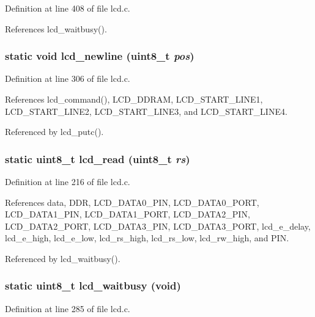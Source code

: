 Definition at line 408 of file lcd.c.

References lcd\_\-waitbusy().
\subsubsection{\setlength{\rightskip}{0pt plus 5cm}static void lcd\_\-newline (uint8\_\-t {\em pos})\hspace{0.3cm}{\tt  [inline, static]}}\label{lcd_8c_a905930e4947d59421e0a8033d971676}




Definition at line 306 of file lcd.c.

References lcd\_\-command(), LCD\_\-DDRAM, LCD\_\-START\_\-LINE1, LCD\_\-START\_\-LINE2, LCD\_\-START\_\-LINE3, and LCD\_\-START\_\-LINE4.

Referenced by lcd\_\-putc().
\subsubsection{\setlength{\rightskip}{0pt plus 5cm}static uint8\_\-t lcd\_\-read (uint8\_\-t {\em rs})\hspace{0.3cm}{\tt  [static]}}\label{lcd_8c_48a16fff03a1164f27b460a49e702dc4}




Definition at line 216 of file lcd.c.

References data, DDR, LCD\_\-DATA0\_\-PIN, LCD\_\-DATA0\_\-PORT, LCD\_\-DATA1\_\-PIN, LCD\_\-DATA1\_\-PORT, LCD\_\-DATA2\_\-PIN, LCD\_\-DATA2\_\-PORT, LCD\_\-DATA3\_\-PIN, LCD\_\-DATA3\_\-PORT, lcd\_\-e\_\-delay, lcd\_\-e\_\-high, lcd\_\-e\_\-low, lcd\_\-rs\_\-high, lcd\_\-rs\_\-low, lcd\_\-rw\_\-high, and PIN.

Referenced by lcd\_\-waitbusy().
\subsubsection{\setlength{\rightskip}{0pt plus 5cm}static uint8\_\-t lcd\_\-waitbusy (void)\hspace{0.3cm}{\tt  [static]}}\label{lcd_8c_4ca4373275e11ba1a2d2cbd242cbf1a4}




Definition at line 285 of file lcd.c.

